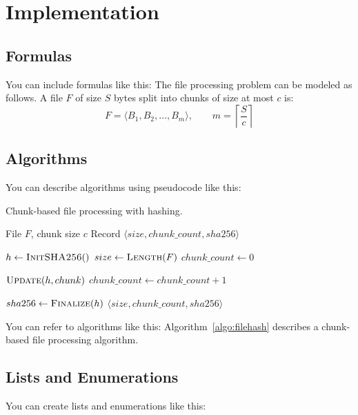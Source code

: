 \chapter{Implementation}
\label{chap:implementation}

\section{Formulas}

You can include formulas like this: The file processing problem can be modeled as follows. A file $F$ of size $S$ bytes split into chunks of size at most $c$ is:
\[ F = \langle B_1, B_2, \ldots, B_m \rangle, \qquad m = \left\lceil \frac{S}{c} \right\rceil \]

\section{Algorithms}

You can describe algorithms using pseudocode like this:

\begin{algorithm}[htbp]
    \caption{Chunk-based file processing with hashing.}
    \label{algo:filehash}
    \begin{algorithmic}[1]
        \Require File $F$, chunk size $c$
        \Ensure Record $\langle size, chunk\_count, sha256 \rangle$

        \State $h \gets \textsc{InitSHA256}()$ 
        \State $size \gets \textsc{Length}(F)$
        \State $chunk\_count \gets 0$
        \Statex

            \State $\textsc{Update}(h, chunk)$
            \State $chunk\_count \gets chunk\_count + 1$
        \EndFor
        \Statex

        \State $sha256 \gets \textsc{Finalize}(h)$
        \State \Return $\langle size, chunk\_count, sha256 \rangle$
    \end{algorithmic}
\end{algorithm}

You can refer to algorithms like this: Algorithm~\ref{algo:filehash} describes a chunk-based file processing algorithm.

\section{Lists and Enumerations}

You can create lists and enumerations like this:


